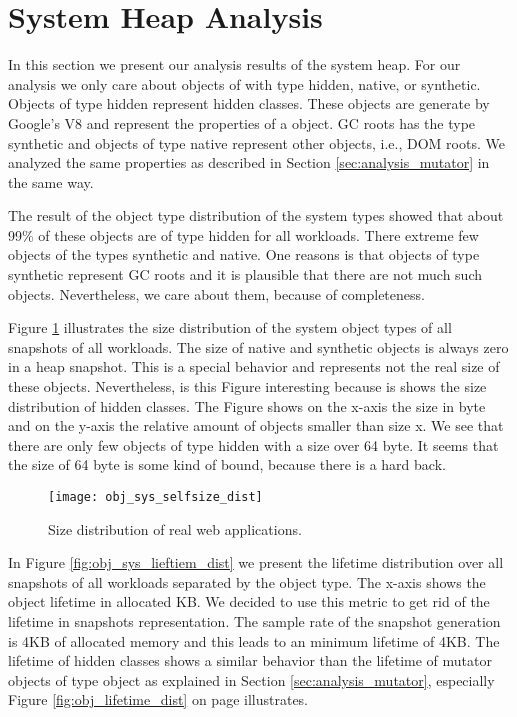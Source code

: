 
\section{System Heap Analysis}  \label{sec:analysis_system}

In this section we present our analysis results of the system heap. For our analysis we only care about objects of with type hidden, native, or synthetic. Objects of type hidden represent hidden classes. These objects are generate by Google's V8 and represent the properties of a object. GC roots has the type synthetic and objects of type native represent other objects, i.e., DOM roots. We analyzed the same properties as described in Section \ref{sec:analysis_mutator} in the same way.

The result of the object type distribution of the system types showed that about 99\% of these objects are of type hidden for all workloads. There extreme few objects of the types synthetic and native. One reasons is that objects of type synthetic represent GC roots and it is plausible that there are not much such objects. Nevertheless, we care about them, because of completeness.

Figure \ref{fig:obj_sys_selfsize_dist} illustrates the size distribution of the system object types of all snapshots of all workloads. The size of native and synthetic objects is always zero in a heap snapshot. This is a special behavior and represents not the real size of these objects. Nevertheless, is this Figure interesting because is shows the size distribution of hidden classes. The Figure shows on the x-axis the size in byte and on the y-axis the relative amount of objects smaller than size x. We see that there are only few objects of type hidden with a size over 64 byte. It seems that the size of 64 byte is some kind of bound, because there is a hard back. 

\begin{figure}
	\centering
	\texttt{[image: obj\_sys\_selfsize\_dist]}
	\caption{Size distribution of real web applications.}
	\label{fig:obj_sys_selfsize_dist}
\end{figure}

In Figure \ref{fig:obj_sys_lieftiem_dist} we present the lifetime distribution over all snapshots of all workloads separated by the object type. The x-axis shows the object lifetime in allocated KB. We decided to use this metric to get rid of the lifetime in snapshots representation. The sample rate of the snapshot generation is 4KB of allocated memory and this leads to an minimum lifetime of 4KB. The lifetime of hidden classes shows a similar behavior than the lifetime of mutator objects of type object as explained in Section \ref{sec:analysis_mutator}, especially Figure \ref{fig:obj_lifetime_dist} on page \pageref{fig:obj_lifetime_dist} illustrates. 

